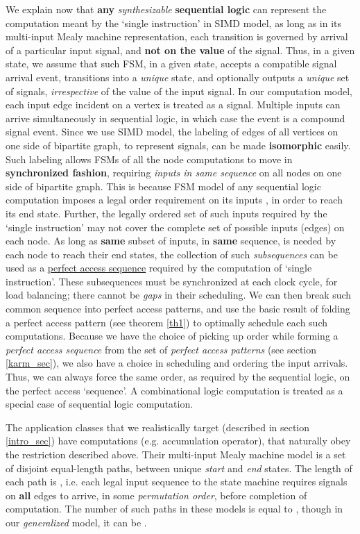 \documentclass[12pt]{article}
\begin{document}
We explain now that \textbf{any}
\textit{synthesizable} \textbf{sequential logic} can represent the computation
meant by the `single instruction' in SIMD model, as long as in its
multi-input Mealy machine representation,
each transition is governed by arrival of a particular input
signal, and \textbf{not on the value} of the
signal. Thus, in a given state, we assume that such FSM, in a
given state, accepts a compatible signal arrival event, transitions into a
\textit{unique} state, and optionally outputs a \textit{unique} set of signals,
\textit{irrespective} of the value of the input signal. In our computation model, each
input edge incident on a vertex is treated as a signal. Multiple inputs can
arrive simultaneously in sequential logic, in which case the event is a
compound signal event. Since we use SIMD
model, the labeling of edges of all vertices on one side of bipartite
graph, to represent signals, can be made \textbf{isomorphic} easily. Such
labeling allows FSMs of all the node computations to move in \textbf{synchronized
fashion}, requiring \textit{inputs in same sequence} on all
nodes on one side of bipartite graph. This is because FSM
model of any sequential logic computation imposes a legal order requirement on its inputs
, in order to reach its end state. Further, the legally ordered set of such inputs
required by the `single instruction' may not cover the complete set of
possible inputs (edges) on each node. As long as \textbf{same} subset
of inputs, in \textbf{same} sequence, is needed by each node to reach their end
states, the collection of such \textit{subsequences} can be used as a
\uline{perfect access sequence} required by the
computation of `single instruction'. These
subsequences must be synchronized at each clock cycle, for load balancing;
there cannot be \textit{gaps} in their scheduling.  We can then
break such common sequence into perfect access patterns, and use
the basic result
of folding a perfect access pattern (see theorem \ref{th1}) to optimally schedule
each such computations. Because we have the choice of picking up order
while forming a \textit{perfect access sequence} from the set of
\textit{perfect access patterns} (see section \ref{karm_sec}), we also have
a choice in scheduling and ordering the input arrivals. Thus, we can always
force the same order, as required by the sequential logic, on the perfect
access `sequence'.
A combinational logic computation is treated as a special case of
sequential logic computation.

The application classes that we realistically target (described in section
\ref{intro_sec}) have computations (e.g. accumulation operator), that
naturally obey the restriction described
above. Their multi-input Mealy machine
model is a set of disjoint equal-length paths, between unique
\textit{start} and \textit{end} states. The length of each path is
, i.e. each legal input sequence to the state machine requires signals
on \textbf{all} edges to arrive, in some \textit{permutation order}, before
completion of computation. The number of such paths in these models is
equal to , though in our \textit{generalized} model, it can be
 .
\end{document}
